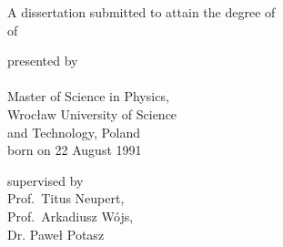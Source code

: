 \begin{titlepage}
    \begin{center}
        \large

        \hfill

        \vfill

        \begingroup
            \spacedallcaps{\myTitle}
        \endgroup

        \vfill

        \begingroup
            A dissertation submitted to attain the degree of\\
            \vspace{0.7em}
            of
        \endgroup

        \vfill

        \begingroup
            presented by\\
            \vspace{0.5em}
            \spacedallcaps{\myName}\\ \vspace{0.5em}
            Master of Science in Physics, \\  \vspace{0.5em} Wrocław University of Science \\ and Technology, Poland \\
            \vspace{0.5em}
            born on 22 August 1991\\
        \endgroup

        \vfill

        \begingroup
			supervised by \\
            \vspace{0.5em}
            Prof.\ Titus Neupert, \\  \vspace{0.3em}
            Prof.\ Arkadiusz Wójs, \\  \vspace{0.3em}
            Dr. Paweł Potasz
        \endgroup

        \vfill

        \myTime%

        \vfill
    \end{center}
\end{titlepage}
